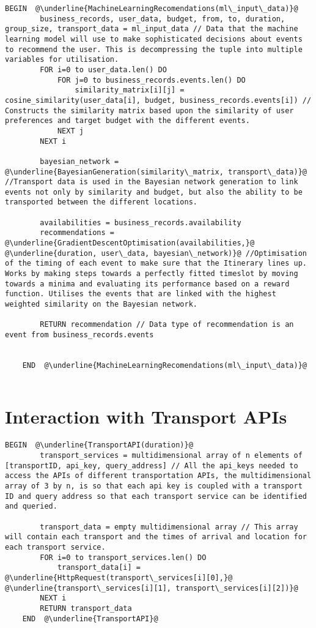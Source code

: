 \begin{lstlisting}[caption=Machine Learning Recommendations and Optimisation, escapechar=\@]
	BEGIN  @\underline{MachineLearningRecomendations(ml\_input\_data)}@
		business_records, user_data, budget, from, to, duration, group_size, transport_data = ml_input_data // Data that the machine learning model will use to make sophisticated decisions about events to recommend the user. This is decompressing the tuple into multiple variables for utilisation.
		FOR i=0 to user_data.len() DO
			FOR j=0 to business_records.events.len() DO
				similarity_matrix[i][j] = cosine_similarity(user_data[i], budget, business_records.events[i]) // Constructs the similarity matrix based upon the similarity of user preferences and target budget with the different events.
			NEXT j
		NEXT i

		bayesian_network = @\underline{BayesianGeneration(similarity\_matrix, transport\_data)}@ //Transport data is used in the Bayesian network generation to link events not only by similarity and budget, but also the ability to be transported between the different locations.

		availabilities = business_records.availability
		recommendations = @\underline{GradientDescentOptimisation(availabilities,}@ @\underline{duration, user\_data, bayesian\_network)}@ //Optimisation of the timing of each event to make sure that the Itinerary lines up. Works by making steps towards a perfectly fitted timeslot by moving towards a minima and evaluating its performance based on a reward function. Utilises the events that are linked with the highest weighted similarity on the Bayesian network. 

		RETURN recommendation // Data type of recommendation is an event from business_records.events
		

	END  @\underline{MachineLearningRecomendations(ml\_input\_data)}@
			
\end{lstlisting}
\section{Interaction with Transport APIs}

\begin{lstlisting}[caption= Interaction with Transport APIs, escapechar=\@]
	BEGIN  @\underline{TransportAPI(duration)}@
		transport_services = multidimensional array of n elements of [transportID, api_key, query_address] // All the api_keys needed to access the APIs of different transportation APIs, the multidimensional array of 3 by n, is so that each api key is coupled with a transport ID and query address so that each transport service can be identified and queried.

		transport_data = empty multidimensional array // This array will contain each transport and the times of arrival and location for each transport service.
		FOR i=0 to transport_services.len() DO
			transport_data[i] = @\underline{HttpRequest(transport\_services[i][0],}@ @\underline{transport\_services[i][1], transport\_services[i][2])}@ 
		NEXT i
		RETURN transport_data
	END  @\underline{TransportAPI}@
\end{lstlisting}


\vfill{}
